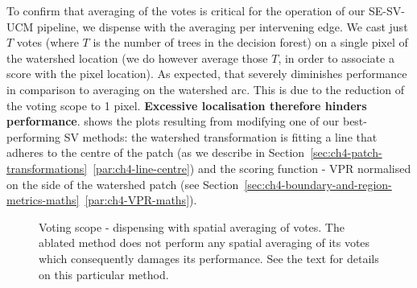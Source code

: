 To confirm %
that averaging of the votes is critical for the operation %
of our SE-SV-UCM pipeline, we dispense with the averaging per intervening edge. We cast just $T$ votes (where $T$ is the number of trees in the decision forest) on a single pixel of the watershed location (we do however average those $T$, in order to associate a score with the pixel location). As expected, that severely diminishes performance in comparison to averaging on the watershed arc. %
This is due to the reduction of the voting scope to 1 pixel. {\bf Excessive localisation therefore hinders performance}.  shows the plots resulting from modifying one of our best-performing SV methods: the watershed transformation is fitting a line that adheres to the centre of the patch (as we describe in Section~\ref*{sec:ch4-patch-transformations}~\ref{par:ch4-line-centre}) and the scoring function - VPR normalised on the side of the watershed patch (see Section~\ref*{sec:ch4-boundary-and-region-metrics-maths}~\ref{par:ch4-VPR-maths}).

\begin{figure}[ht!]
\centering
\caption[Voting scope: dispensing with spatial averaging of votes - plots]{Voting scope - dispensing with spatial averaging of votes. The ablated method does not perform any spatial averaging of its votes which consequently damages its performance. See the text for details on this particular method.}
\label{fig:reduced-vote-scope}
\end{figure}

